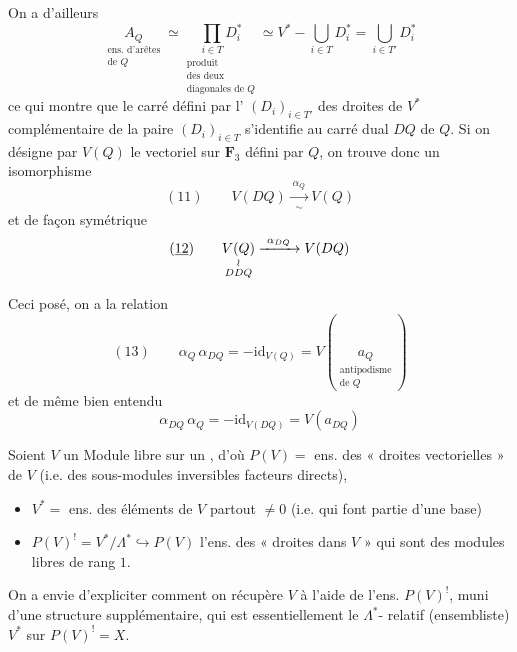 \documentclass[11pt,a4paper]{article}
\begin{document}
 On a d'ailleurs
\[
  \underset{\substack{\text{ens. d'arêtes} \\ \text{de } Q}}{A_Q}
  \simeq
  \underset{\substack{\text{produit} \\ \text{des deux} \\ \text{diagonales de } Q}}{\prod_{i \in T} D_i^{*}}
  \simeq V^{*} - \bigcup_{i \in T} D_i^{*} = \bigcup_{i \in T'} D_i^{*}
\]
ce qui montre que \struck{\ill{}} le carré défini par l'
 $(D_i)_{i \in T'}$ des droites de $V^{*}$ complémentaire de la paire
$(D_i)_{i \in T}$ s'identifie au carré dual $DQ$ de $Q$. Si on désigne par
$V(Q)$ le  vectoriel sur $\mathbf{F}_3$ défini par $Q$, on trouve
donc un isomorphisme
\[
  (11) \qquad V(DQ) \xrightarrow[\ \sim\ ]{\ \alpha_Q\ } V(Q)
\]
et de façon symétrique
\[
  (\uncertain{12}) \qquad
  \underset{\substack{\wr \\ DDQ}}{V(Q)} \xrightarrow{\ \alpha_{DQ}\ } V(DQ)
\]

Ceci posé, on a la relation
\[
  (13) \qquad \alpha_Q\, \alpha_{DQ} = -\mathrm{id}_{V(Q)}
  = V(\underset{\substack{\text{antipodisme} \\ \text{de } Q}}{a_Q})
\]
et de même bien entendu
\[
  \alpha_{DQ}\, \alpha_Q = -\mathrm{id}_{V(DQ)} = V(a_{DQ})
\]


Soient $V$ un Module  libre  sur un
 , d'où $P(V) =$ ens. des
« droites vectorielles » de $V$ (i.e. des sous-modules 
 inversibles facteurs directs), 
\begin{itemize}
  \item[(1)] $V^{*} =$ ens. des éléments de $V$ partout $\neq 0$ (i.e. qui font
    partie d'une base)
  \item[(2)] $P(V)^! = V^{*} / \Lambda^{*} \hookrightarrow P(V)$
    l'ens. des « droites dans $V$ » qui sont des modules libres de rang $1$.
\end{itemize}

On a envie d'expliciter comment on récupère  $V$ à
l'aide de l'ens. $P(V)^!$, muni d'une structure supplémentaire, qui est
 essentiellement le $\Lambda^{*}$- relatif
(ensembliste) $V^{*}$ sur $P(V)^! = X$.
\end{document}
